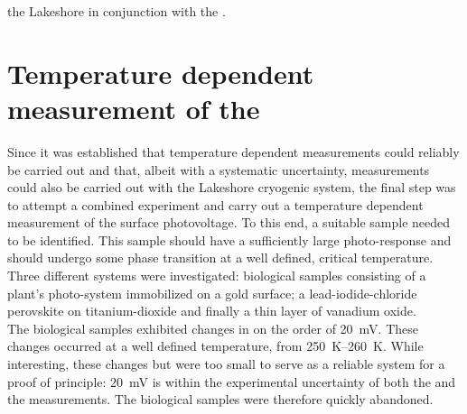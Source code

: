 the Lakeshore in conjunction with the \led{}.


\section{Temperature dependent measurement of the \spv{}}
Since it was established that temperature dependent \cpd{} measurements could reliably be carried out and that, albeit with a systematic uncertainty, \spv{} measurements could also be carried out with the Lakeshore cryogenic system, the final step was to attempt a combined experiment and carry out a temperature dependent measurement of the surface photovoltage. To this end, a suitable sample needed to be identified. This sample should have a sufficiently large photo-response and should undergo some phase transition at a well defined, critical temperature. Three different systems were investigated: biological samples consisting of a plant's photo-system immobilized on a gold surface; a lead-iodide-chloride perovskite on titanium-dioxide and finally a thin layer of vanadium oxide.\\
The biological samples exhibited changes in \cpd{} on the order of \SI{20}{\milli\volt}. These changes occurred at a well defined temperature, from \SIrange{250}{260}{\kelvin}. While interesting, these changes but were too small to serve as a reliable system for a proof of principle: \SI{20}{\milli\volt} is within the experimental uncertainty of both the \cpd{} and the \spv{} measurements. The biological samples were therefore quickly abandoned.\\

